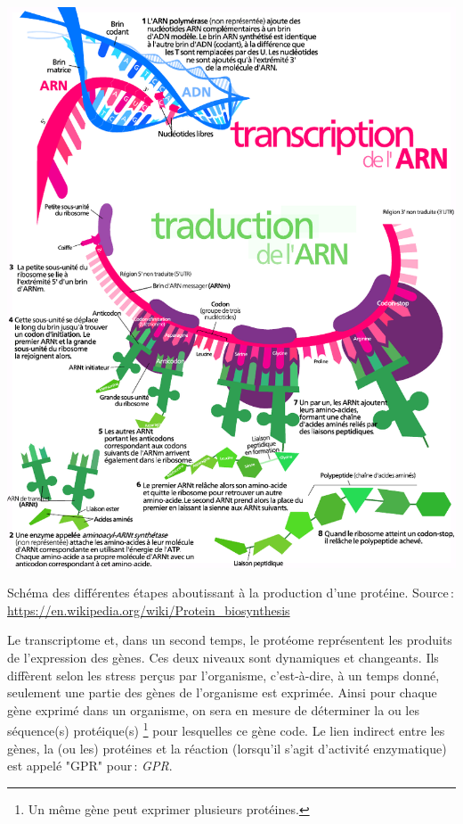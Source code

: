 \begin{refsegment}
    \begin{shadedfigure}[H]
        \centering
        \includegraphics[width=\textwidth]{img/production_proteine2.pdf}
        \caption{Schéma des différentes étapes aboutissant à la production d'une protéine.\hspace{\textwidth} Source : \url{https://en.wikipedia.org/wiki/Protein_biosynthesis}}
        \label{fig:production_proteine}
    \end{shadedfigure}
    
    Le transcriptome et, dans un second temps, le protéome représentent les produits de l'expression des gènes. Ces deux niveaux sont dynamiques et changeants. Ils diffèrent selon les stress perçus par l'organisme, c'est-à-dire, à un temps donné, seulement une partie des gènes de l'organisme est exprimée. Ainsi pour chaque gène exprimé dans un organisme, on sera en mesure de déterminer la ou les séquence(s) protéique(s) \footnote{Un même gène peut exprimer plusieurs protéines.} pour lesquelles ce gène code. Le lien indirect entre les gènes, la (ou les) protéines et la réaction (lorsqu'il s'agit d'activité enzymatique) est appelé "\acrshort{GPR}" pour : \textit{\acrfull{GPR}}.
    

\end{refsegment}
